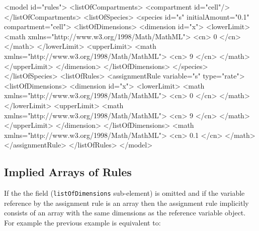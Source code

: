 \documentclass{cekarticle}
\begin{document}
\begin{example}
<model id="rules">
    <listOfCompartments>
        <compartment id="cell"/>
    </listOfCompartments>
    <listOfSpecies>
        <species id="s" initialAmount="0.1" compartment="cell">
            <listOfDimensions>
                <dimension id="x">
                    <lowerLimit>
                        <math xmlns="http://www.w3.org/1998/Math/MathML">
                            <cn> 0 </cn>
                        </math>
                    </lowerLimit>
                    <upperLimit>
                        <math xmlns="http://www.w3.org/1998/Math/MathML">
                            <cn> 9 </cn>
                        </math>
                    </upperLimit>
                </dimension>
            </listOfDimensions>
        </species>
    </listOfSpecies>
    <listOfRules>
        <assignmentRule variable="s" type="rate">
            <listOfDimensions>
                <dimension id="x">
                    <lowerLimit>
                        <math xmlns="http://www.w3.org/1998/Math/MathML">
                            <cn> 0 </cn>
                        </math>
                    </lowerLimit>
                    <upperLimit>
                        <math xmlns="http://www.w3.org/1998/Math/MathML">
                            <cn> 9 </cn>
                        </math>
                    </upperLimit>
                </dimension>
            </listOfDimensions>
            <math xmlns="http://www.w3.org/1998/Math/MathML">
                <cn> 0.1 </cn>
            </math>
        </assignmentRule>
    </listOfRules>
</model>
\end{example}

\subsection{Implied Arrays of Rules}

If the the  field
(\texttt{listOfDimensions} sub-element) is omitted and if the variable reference by the
assignment rule is an array then the assignment rule implicitly consists of an array with the
same dimensions as the reference variable object.  For example the previous example is equivalent to:
\end{document}
